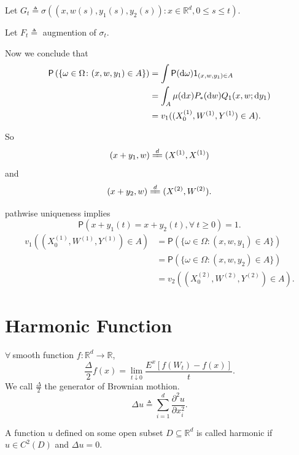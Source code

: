 {    Let $G_t \triangleq \sigma((x,w(s),y_1(s),y_2(s)) \colon x\in \mathbb{R}^d, 0 \leq s \leq t )$.

    Let $F_t \triangleq $ augmention of $\sigma_t$.

    Now we conclude that 
    $$
    \begin{aligned}
        \mathsf{P}\left( \{\omega \in \Omega \colon (x,w,y_1)\in A\} \right) &= 
        \int \mathsf{P}(\mathop{}\!\mathrm{d} \omega) \mathsf{1}_{(x,w,y_1)\in A} \\
        &= \int_{A} \mu(\mathop{}\!\mathrm{d} x) P_*(\mathop{}\!\mathrm{d} w)Q_1(x,w;\mathop{}\!\mathrm{d} y_1)\\
        &= v_1((X_0^{(1)} ,W^{(1)}, Y^{(1)})\in A).
    \end{aligned}
    $$

    So 
    $$
    (x+y_1,w) \xlongequal{d} (X^{(1)},X^{(1)})
    $$
    and 
    $$
    (x+y_2,w) \xlongequal{d} (X^{(2)},W^{(2)}).
    $$

    pathwise uniqueness implies
    $$
    \mathsf{P}(x+y_1(t) = x+y_2(t),\forall~ t \geq 0) = 1.
    $$
    $$
    \begin{aligned}
        v_1((X_0^{(1)},W^{(1)},Y^{(1)})\in A) &=
        \mathsf{P}(\{\omega \in \Omega\colon (x,w,y_1)\in A\}) \\
        &= \mathsf{P}(\{\omega \in \Omega \colon (x,w,y_2)\in A\}) \\
        &=v_2((X_0^{(2)},W^{(2)},Y^{(2)})\in A).
    \end{aligned}
    $$
}

\section{Harmonic Function}

$\forall~ $smooth function $f:\mathbb{R}^d \to \mathbb{R}$,
$$
    \frac{\Delta}{2} f(x) = \lim_{t \downarrow 0} \frac{E^x[f(W_t) - f(x)]}{t}.
$$
We call $\frac{\Delta}{2}$ the generator of Brownian mothion.
$$
\Delta u \triangleq \sum_{i=1}^{d} \frac{\partial^2 u}{\partial x_i^2}.
$$


A function $u$ defined on some open subset $D \subseteq \mathbb{R}^d$ is called harmonic if $u \in C^2(D)$ and $\Delta u = 0$. 

